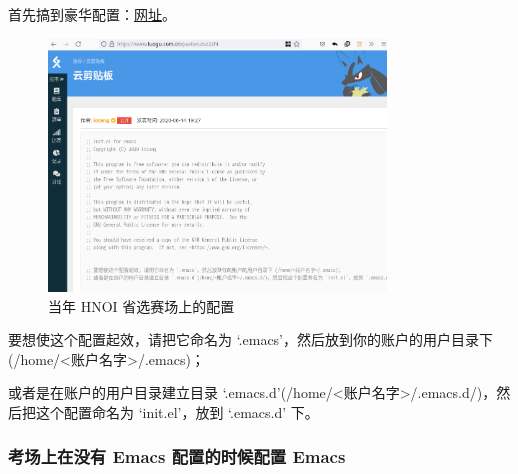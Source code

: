 \documentclass[UTF-8]{ctexart}
\begin{document}
				首先搞到豪华配置：\href{https://www.luogu.com.cn/paste/uzsz2zf4}{网址}。
				
				\begin{figure}[H]
					\centering
					\includegraphics[width=0.8\textwidth]{fig/emacs_init_el.png}
					\caption*{当年 HNOI 省选赛场上的配置}
				\end{figure}
			
				要想使这个配置起效，请把它命名为 `.emacs'，然后放到你的账户的用户目录下 (/home/<账户名字>/.emacs)；
				
				或者是在账户的用户目录建立目录 `.emacs.d'(/home/<账户名字>/.emacs.d/)，然后把这个配置命名为 `init.el'，放到 `.emacs.d' 下。
			
			
			\subsubsection{考场上在没有 Emacs 配置的时候配置 Emacs}
			
\end{document}
